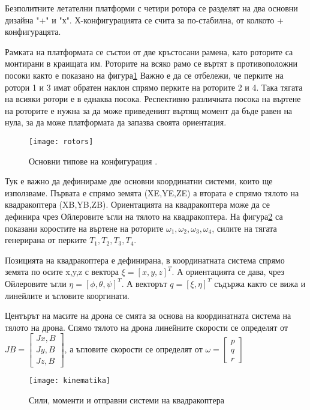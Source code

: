 \FloatBarrier
Безполитните летателни платформи с четири ротора се разделят на два основни дизайна "+" и "х". 
Х-конфигурацията се счита за по-стабилна, от колкото + конфигурацята.

Рамката на платформата се състои от две кръстосани рамена, като роторите са монтирани в краищата им.
Роторите на всяко рамо се въртят в противоположни посоки както е показано на фигура\ref{fig:rotors}
Важно е да се отбележи, че перките на ротори 1 и 3 имат обратен наклон  спрямо перките на роторите 2 и 4.
Така тягата на всияки ротори е в еднаква посока. Респективно различната посока на въртене на роторите е нужна
за да може приведеният въртящ момент да бъде равен на нула, за да може платформата да запазва своята ориентация.

\begin{figure}[!h]
	\centering
	\texttt{[image: rotors]}
	\caption{Основни типове на конфигурация .}
	\label{fig:rotors}
\end{figure}


Тук е важно да дефинираме две основни координатни системи, които ще използваме. 
Първата е спрямо земята (XE,YE,ZE)  а втората е спрямо тялото на квадракоптера (XB,YB,ZB).
Ориентацията на квадракоптера може да се дефинира чрез Ойлеровите ъгли на тялото на квадракоптера.
На фигура\ref{fig:kinematika} са показани коростите на въртене на роторите \( \omega_1 , \omega_2 ,
\omega_3 , \omega_4 \), силите на тягата генерирана от перките \(T_1,T_2,T_3,T_4\).

Позицията на квадракоптера е дефинирана, в координатната система спрямо земята по осите x,y,z с вектора 
\(\xi = [x,y,z]^T\). А ориентацията се дава, чрез Ойлеровите ъгли \(\eta = [\phi,\theta,\psi]^T\).
А векторът \(q = [\xi,\eta]^T\) съдържа както се вижа и линейлите и ъгловите кооргинати.

Центърът на масите на дрона се смята за основа на координатната система на тялото на дрона. Спямо тялото на дрона
линейните скорости се определят от \(JB = \begin{bmatrix}Jx,B\\Jy,B\\Jz,B\end{bmatrix}\), а ъгловите скорости се
определят от \(\omega = \begin{bmatrix}p\\q\\r \end{bmatrix}\)

\begin{figure}[!h]
    \centering
    \texttt{[image: kinematika]}
    \caption{Сили, моменти и отправни системи на квадракоптера}
    \label{fig:kinematika}
\end{figure}

